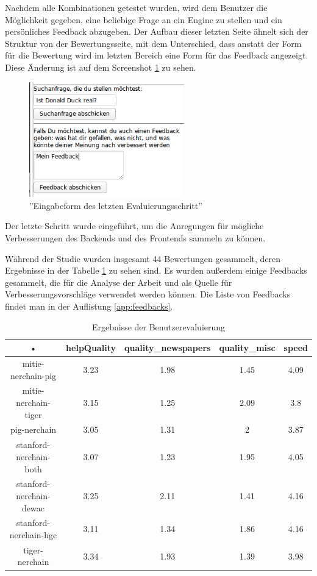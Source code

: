 Nachdem alle Kombinationen getestet wurden, wird dem Benutzer die Möglichkeit gegeben, eine beliebige Frage an ein Engine zu stellen und ein persönliches Feedback abzugeben. Der Aufbau dieser letzten Seite ähnelt sich der Struktur von der Bewertungsseite, mit dem Unterschied, dass anstatt der Form für die Bewertung wird im letzten Bereich eine Form für das Feedback angezeigt. Diese Änderung ist auf dem Screenshot \ref{fig:finish-eval} zu sehen. 

\begin{figure}
\centering
\includegraphics[width=0.6\textwidth]{Bilder/ende-eval-01.png}
\caption{''Eingabeform des letzten Evaluierungsschritt''}
\label{fig:finish-eval}
\end{figure}

Der letzte Schritt wurde eingeführt, um die Anregungen für mögliche Verbesserungen des Backends und des Frontends sammeln zu können.

Während der Studie wurden insgesamt 44 Bewertungen gesammelt, deren Ergebnisse in der Tabelle \ref{app:RESULTS} zu sehen sind. Es wurden außerdem einige Feedbacks gesammelt, die für die Analyse der Arbeit und als Quelle für Verbesserungsvorschläge verwendet werden können. Die Liste von Feedbacks findet man in der Auflistung \ref{app:feedbacks}.

\begin{table}
\begin{tabular}{|c|c|c|c|c|}
\hline 
• & helpQuality & quality\_newspapers & quality\_misc & speed \\ 
\hline 
mitie-nerchain-pig & 3.23 & 1.98 & 1.45 & 4.09 \\ 
\hline 
mitie-nerchain-tiger & 3.15 & 1.25 & 2.09 & 3.8 \\ 
\hline 
pig-nerchain & 3.05 & 1.31 & 2 & 3.87 \\ 
\hline 
stanford-nerchain-both & 3.07 & 1.23 & 1.95 & 4.05 \\ 
\hline 
stanford-nerchain-dewac & 3.25 & 2.11 & 1.41 & 4.16 \\ 
\hline 
stanford-nerchain-hgc & 3.11 & 1.34 & 1.86 & 4.16 \\ 
\hline 
tiger-nerchain & 3.34 & 1.93 & 1.39 & 3.98 \\ 
\hline 
\end{tabular} 
\caption{Ergebnisse der Benutzerevaluierung}
\label{app:RESULTS}
\end{table}

